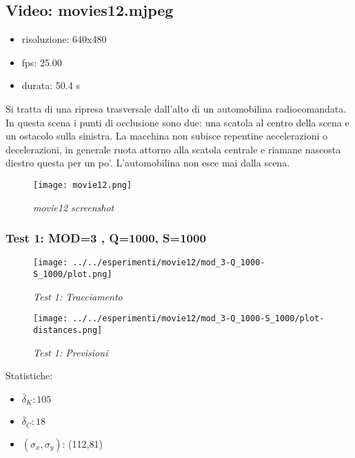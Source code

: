\newpage

\subsection{Video: movies12.mjpeg}
\begin{itemize}
\item risoluzione: 640x480
\item fps: 25.00
\item durata: 50.4 s
\end{itemize}

Si tratta di una ripresa trasversale dall'alto di un automobilina radiocomandata. In questa scena i punti di occlusione sono due: una scatola al centro della scena e un ostacolo sulla sinistra. La macchina non subisce repentine accelerazioni o decelerazioni, in generale ruota attorno alla scatola centrale e riamane nascosta diestro questa per un po'. L'automobilina non esce mai dalla scena.

\begin{figure}[hb]
\centering
	\texttt{[image: movie12.png]}
\caption{\textit{movie12 screenshot}\label{fig:movie12 screenshot}}
\end{figure}
 
\newpage

\subsubsection{Test 1: MOD=3 , Q=1000, S=1000}

\begin{figure}[hb]
\centering
	\texttt{[image: ../../esperimenti/movie12/mod\_3-Q\_1000-S\_1000/plot.png]}
\caption{\textit{Test 1: Tracciamento}\label{fig:Test 1}}
\end{figure}

\begin{figure}[hb]
\centering
	\texttt{[image: ../../esperimenti/movie12/mod\_3-Q\_1000-S\_1000/plot-distances.png]}
\caption{\textit{Test 1: Previsioni}\label{fig:Test 1}}
\end{figure}

Statistiche:
\begin{itemize}
\item \begin{math} \bar \delta_K: 105 \end{math}
\item \begin{math} \bar \delta_C: 18 \end{math}
\item \begin{math}(\sigma_x,\sigma_y)\end{math}: (112,81)
\end{itemize}

